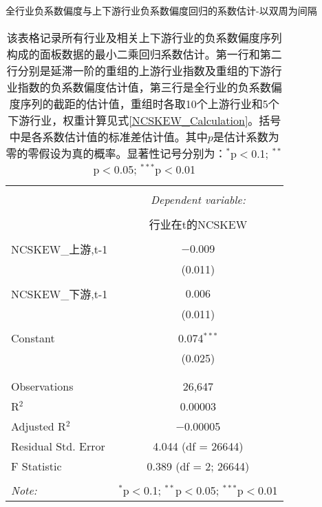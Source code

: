 \documentclass{sysuthesis}
\begin{document}
\begin{table}[!htbp] \centering 
\caption{全行业负系数偏度与上下游行业负系数偏度回归的系数估计-以双周为间隔} 
  \caption*{\footnotesize 该表格记录所有行业及相关上下游行业的负系数偏度序列构成的面板数据的最小二乘回归系数估计。第一行和第二行分别是延滞一阶的重组的上游行业指数及重组的下游行业指数的负系数偏度估计值，第三行是全行业的负系数偏度序列的截距的估计值，重组时各取10个上游行业和5个下游行业，权重计算见式\ref{NCSKEW_Calculation}。括号中是各系数估计值的标准差估计值。其中$p$是估计系数为零的零假设为真的概率。显著性记号分别为：{$^{*}$p$<$0.1; $^{**}$p$<$0.05; $^{***}$p$<$0.01}} 
  \renewcommand{\arraystretch}{0.5}
\begin{tabular}{@{\extracolsep{5pt}}lc} 
\\[-1.8ex]\hline 
\hline \\[-1.8ex] 
 & \multicolumn{1}{c}{\textit{Dependent variable:}} \\ 
\cline{2-2} 
\\[-1.8ex] & 行业在t的NCSKEW \\ 
\hline \\[-1.8ex] 
 NCSKEW\_{上游,t-1} & $-$0.009 \\ 
  & (0.011) \\ 
  & \\ 
 NCSKEW\_{下游,t-1} & 0.006 \\ 
  & (0.011) \\ 
  & \\ 
 Constant & 0.074$^{***}$ \\ 
  & (0.025) \\ 
  & \\ 
\hline \\[-1.8ex] 
Observations & 26,647 \\ 
R$^{2}$ & 0.00003 \\ 
Adjusted R$^{2}$ & $-$0.00005 \\ 
Residual Std. Error & 4.044 (df = 26644) \\ 
F Statistic & 0.389 (df = 2; 26644) \\ 
\hline 
\hline \\[-1.8ex] 
\textit{Note:}  & \multicolumn{1}{r}{$^{*}$p$<$0.1; $^{**}$p$<$0.05; $^{***}$p$<$0.01} \\ 
\end{tabular} 
\end{table} 
\end{document}
